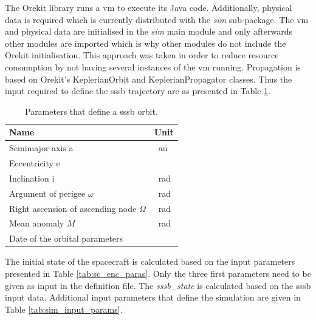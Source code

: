 The Orekit library runs a \gls{vm} to execute its Java code. Additionally, physical data is required which is currently distributed with the \textit{sim} sub-package. The \gls{vm} and physical data are initialised in the \textit{sim} main module and only afterwards other modules are imported which is why other modules do not include the Orekit initialisation. This approach was taken in order to reduce resource consumption by not having several instances of the \gls{vm} running. Propagation is based on Orekit's KeplerianOrbit and KeplerianPropagator classes. Thus the input required to define the \gls{sssb} trajectory are as presented in Table \ref{tab:keplerorbit_params}.

\begin{table}[htb]
    \centering
    \caption{Parameters that define a \gls{sssb} orbit.}
    \label{tab:keplerorbit_params}
    \begin{tabular}{p{}|p{}}
        \textbf{Name}    & \textbf{Unit} \\ \hline
        Semi\-major axis a & \SI{}{\astronomicalunit} \\
        Eccentricity e & \SI{}{} \\
        Inclination i & \SI{}{\radian} \\
        Argument of perigee  $\omega$ & \SI{}{\radian}  \\
        Right ascension of ascending node $\Omega$ & \SI{}{\radian} \\
        Mean anomaly $M$ & \SI{}{\radian}\\
        Date of the orbital parameters &  
    \end{tabular}
\end{table}

The initial state of the spacecraft is calculated based on the input parameters presented in Table \ref{tab:sc_enc_paras}. Only the three first parameters need to be given as input in the definition file. The \textit{sssb\_state} is calculated based on the \gls{sssb} input data. Additional input parameters that define the simulation are given in Table \ref{tab:sim_input_params}.


